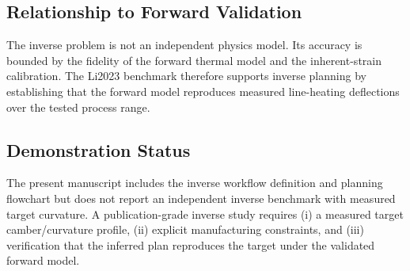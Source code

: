 \subsection{Relationship to Forward Validation}
The inverse problem is not an independent physics model. Its accuracy is bounded by the fidelity of the forward thermal model and the inherent-strain calibration. The Li2023 benchmark therefore supports inverse planning by establishing that the forward model reproduces measured line-heating deflections over the tested process range.

\subsection{Demonstration Status}
The present manuscript includes the inverse workflow definition and planning flowchart but does not report an independent inverse benchmark with measured target curvature. A publication-grade inverse study requires (i) a measured target camber/curvature profile, (ii) explicit manufacturing constraints, and (iii) verification that the inferred plan reproduces the target under the validated forward model.
